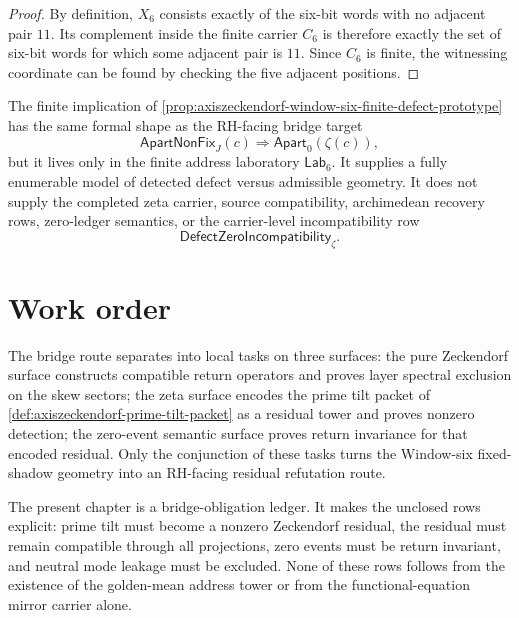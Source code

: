 \begin{proof}
By definition, $X_6$ consists exactly of the six-bit words with no adjacent
pair $11$.  Its complement inside the finite carrier $C_6$ is therefore
exactly the set of six-bit words for which some adjacent pair is $11$.  Since
$C_6$ is finite, the witnessing coordinate can be found by checking the five
adjacent positions.
\end{proof}

\begin{principle}
\label{prin:axiszeckendorf-window-six-prototype-not-rh-incompatibility}
The finite implication of
\autoref{prop:axiszeckendorf-window-six-finite-defect-prototype} has the
same formal shape as the RH-facing bridge target
$$
\mathsf{ApartNonFix}_J(c)
\Longrightarrow
\mathsf{Apart}_0(\zeta(c)),
$$
but it lives only in the finite address laboratory $\mathsf{Lab}_6$.
It supplies a fully enumerable model of detected defect versus admissible
geometry.  It does not supply the completed zeta carrier, source
compatibility, archimedean recovery rows, zero-ledger semantics, or the
carrier-level incompatibility row
$$
\mathsf{DefectZeroIncompatibility}_{\zeta}.
$$
\end{principle}

\section{Work order}
\label{sec:axiszeckendorf-zeta-bridge-work-order}

\begin{principle}
\label{prin:axiszeckendorf-local-work-before-rh-closure}
The bridge route separates into local tasks on three surfaces: the pure
Zeckendorf surface constructs compatible return operators and proves layer
spectral exclusion on the skew sectors; the zeta surface encodes the prime
tilt packet of \autoref{def:axiszeckendorf-prime-tilt-packet} as a residual
tower and proves nonzero detection; the zero-event semantic surface proves
return invariance for that encoded residual.  Only the conjunction of these
tasks turns the Window-six fixed-shadow geometry into an RH-facing residual
refutation route.
\end{principle}

\begin{remark}
\label{rem:axiszeckendorf-zeta-bridge-status}
The present chapter is a bridge-obligation ledger.  It makes the unclosed
rows explicit: prime tilt must become a nonzero Zeckendorf residual, the
residual must remain compatible through all projections, zero events must be
return invariant, and neutral mode leakage must be excluded.  None of these
rows follows from the existence of the golden-mean address tower or from the
functional-equation mirror carrier alone.
\end{remark}

